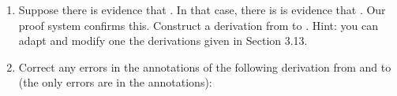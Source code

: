 \begin{enumerate}
\begin{argument*}









\end{argument*}

 \item Suppose there is evidence that . In that case,  
  there is is evidence that . Our proof system 
  confirms this. Construct a derivation from  
  to . Hint: you can adapt and modify 
  one the derivations given in Section 3.13.
\opts{\newpage}{}

\item Correct any errors in the annotations of the following derivation from 
  and  to  (the only errors are 
 in the annotations):



\begin{argumentN}[1]




\end{argumentN}
\end{enumerate}
